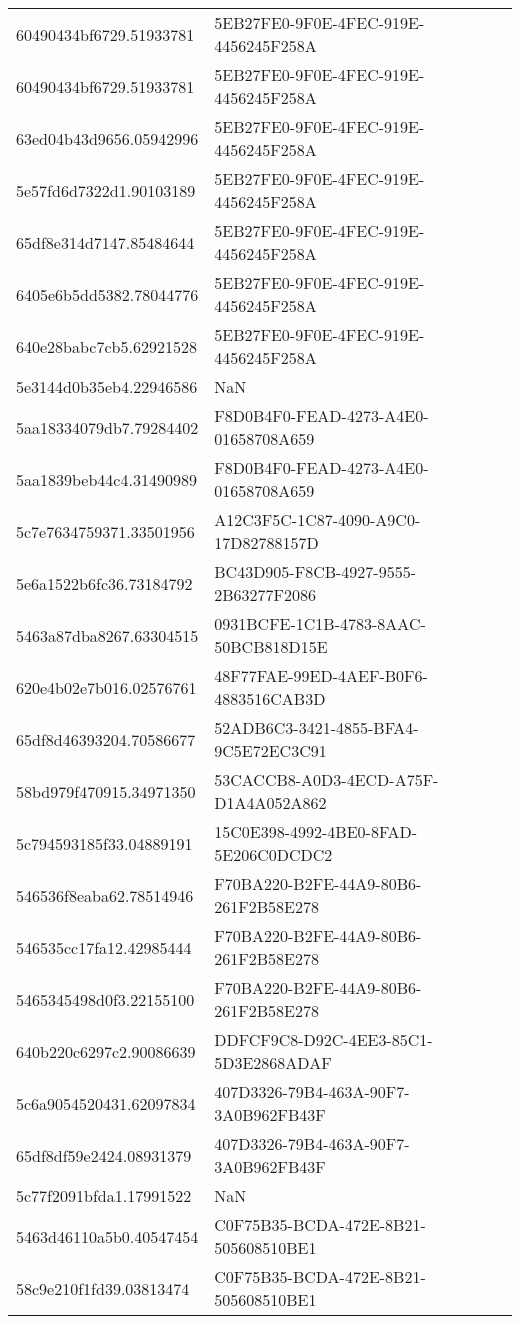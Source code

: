 \begin{tabular}{ll}
60490434bf6729.51933781 & 5EB27FE0-9F0E-4FEC-919E-4456245F258A \\
60490434bf6729.51933781 & 5EB27FE0-9F0E-4FEC-919E-4456245F258A \\
63ed04b43d9656.05942996 & 5EB27FE0-9F0E-4FEC-919E-4456245F258A \\
5e57fd6d7322d1.90103189 & 5EB27FE0-9F0E-4FEC-919E-4456245F258A \\
65df8e314d7147.85484644 & 5EB27FE0-9F0E-4FEC-919E-4456245F258A \\
6405e6b5dd5382.78044776 & 5EB27FE0-9F0E-4FEC-919E-4456245F258A \\
640e28babc7cb5.62921528 & 5EB27FE0-9F0E-4FEC-919E-4456245F258A \\
5e3144d0b35eb4.22946586 & NaN \\
5aa18334079db7.79284402 & F8D0B4F0-FEAD-4273-A4E0-01658708A659 \\
5aa1839beb44c4.31490989 & F8D0B4F0-FEAD-4273-A4E0-01658708A659 \\
5c7e7634759371.33501956 & A12C3F5C-1C87-4090-A9C0-17D82788157D \\
5e6a1522b6fc36.73184792 & BC43D905-F8CB-4927-9555-2B63277F2086 \\
5463a87dba8267.63304515 & 0931BCFE-1C1B-4783-8AAC-50BCB818D15E \\
620e4b02e7b016.02576761 & 48F77FAE-99ED-4AEF-B0F6-4883516CAB3D \\
65df8d46393204.70586677 & 52ADB6C3-3421-4855-BFA4-9C5E72EC3C91 \\
58bd979f470915.34971350 & 53CACCB8-A0D3-4ECD-A75F-D1A4A052A862 \\
5c794593185f33.04889191 & 15C0E398-4992-4BE0-8FAD-5E206C0DCDC2 \\
546536f8eaba62.78514946 & F70BA220-B2FE-44A9-80B6-261F2B58E278 \\
546535cc17fa12.42985444 & F70BA220-B2FE-44A9-80B6-261F2B58E278 \\
5465345498d0f3.22155100 & F70BA220-B2FE-44A9-80B6-261F2B58E278 \\
640b220c6297c2.90086639 & DDFCF9C8-D92C-4EE3-85C1-5D3E2868ADAF \\
5c6a9054520431.62097834 & 407D3326-79B4-463A-90F7-3A0B962FB43F \\
65df8df59e2424.08931379 & 407D3326-79B4-463A-90F7-3A0B962FB43F \\
5c77f2091bfda1.17991522 & NaN \\
5463d46110a5b0.40547454 & C0F75B35-BCDA-472E-8B21-505608510BE1 \\
58c9e210f1fd39.03813474 & C0F75B35-BCDA-472E-8B21-505608510BE1 \\

\end{tabular}

